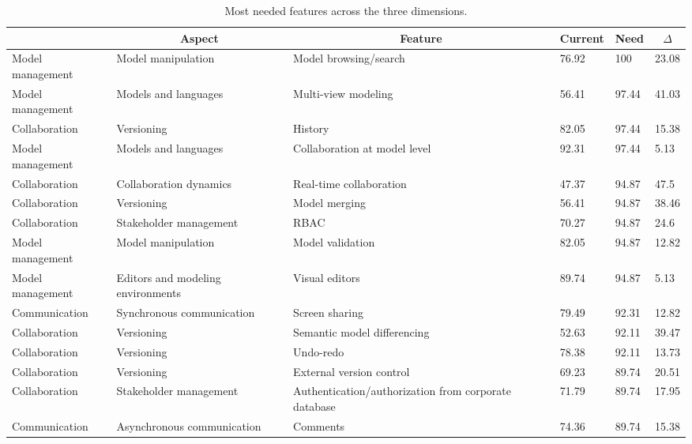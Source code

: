 
  \begin{table*}[]
  \centering
  \notsotiny
  \caption{ Most needed features across the three dimensions.}
\label{tab:most-needed}
\begin{tabular}{|l|l|l|l|l|l|}
  \hline
  \rowcolor[HTML]{C0C0C0}
    \multicolumn{1}{|c|}{Dimension} & \multicolumn{1}{c|}{Aspect} & \multicolumn{1}{c|}{Feature} & \multicolumn{1}{c|}{Current} & \multicolumn{1}{c|}{Need} & \multicolumn{1}{c|}{$\Delta$} \\ \hline
    Model management & Model manipulation & Model browsing/search & 76.92 & 100 & 23.08 \\ \hline 
Model management & Models and languages & Multi-view modeling & 56.41 & 97.44 & 41.03 \\ \hline 
Collaboration & Versioning & History & 82.05 & 97.44 & 15.38 \\ \hline 
Model management & Models and languages & Collaboration at model level & 92.31 & 97.44 & 5.13 \\ \hline 
Collaboration & Collaboration dynamics & Real-time collaboration & 47.37 & 94.87 & 47.5 \\ \hline 
Collaboration & Versioning & Model merging & 56.41 & 94.87 & 38.46 \\ \hline 
Collaboration & Stakeholder management & RBAC & 70.27 & 94.87 & 24.6 \\ \hline 
Model management & Model manipulation & Model validation & 82.05 & 94.87 & 12.82 \\ \hline 
Model management & Editors and modeling environments & Visual editors & 89.74 & 94.87 & 5.13 \\ \hline 
Communication & Synchronous communication & Screen sharing & 79.49 & 92.31 & 12.82 \\ \hline 
Collaboration & Versioning & Semantic model differencing & 52.63 & 92.11 & 39.47 \\ \hline 
Collaboration & Versioning & Undo-redo & 78.38 & 92.11 & 13.73 \\ \hline 
Collaboration & Versioning & External version control & 69.23 & 89.74 & 20.51 \\ \hline 
Collaboration & Stakeholder management & Authentication/authorization from corporate database & 71.79 & 89.74 & 17.95 \\ \hline 
Communication & Asynchronous communication & Comments & 74.36 & 89.74 & 15.38 \\ \hline 

\end{tabular}
\end{table*}

